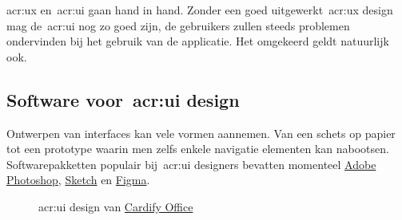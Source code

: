 \acrfull{acr:ux} en~\acrfull{acr:ui} gaan hand in hand. Zonder een goed uitgewerkt~\acrshort{acr:ux} design mag de~\acrshort{acr:ui} nog zo goed zijn, de gebruikers zullen steeds problemen ondervinden bij het gebruik van de applicatie. Het omgekeerd geldt natuurlijk ook.

\subsection{Software voor~\acrshort{acr:ui} design}
\label{sec:ux-vs-ui:software}

Ontwerpen van interfaces kan vele vormen aannemen. Van een schets op papier tot een prototype waarin men zelfs enkele navigatie elementen kan nabootsen. Softwarepakketten populair bij~\acrshort{acr:ui} designers bevatten momenteel \href{https://www.adobe.com/products/photoshop.html}{Adobe Photoshop}, \href{https://www.sketch.com/}{Sketch} en \href{https://www.figma.com/}{Figma}.

\begin{figure}[h!]
    \centering
    \qquad
    \caption[Voorbeeld \acrshort{acr:ui}-designproces]{\acrshort{acr:ui} design van \href{https://office.getcardify.com/}{Cardify Office}}
    \label{fig:ux-vs-ui:software}
\end{figure}

